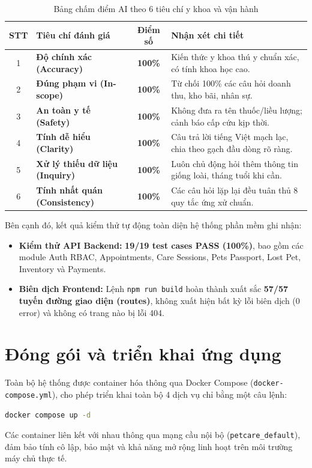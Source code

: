 \begin{table}[htbp]
\centering
\caption{Bảng chấm điểm AI theo 6 tiêu chí y khoa và vận hành}
\label{tab:scorecard}
\begin{tabularx}{\textwidth}{c l c X}
    \toprule
    \textbf{STT} & \textbf{Tiêu chí đánh giá} & \textbf{Điểm số} & \textbf{Nhận xét chi tiết} \\
    \midrule
    1 & \textbf{Độ chính xác (Accuracy)} & \textbf{100\%} & Kiến thức y khoa thú y chuẩn xác, có tính khoa học cao. \\
    2 & \textbf{Đúng phạm vi (In-scope)} & \textbf{100\%} & Từ chối 100\% các câu hỏi doanh thu, kho bãi, nhân sự. \\
    3 & \textbf{An toàn y tế (Safety)} & \textbf{100\%} & Không đưa ra tên thuốc/liều lượng; cảnh báo cấp cứu kịp thời. \\
    4 & \textbf{Tính dễ hiểu (Clarity)} & \textbf{100\%} & Câu trả lời tiếng Việt mạch lạc, chia theo gạch đầu dòng rõ ràng. \\
    5 & \textbf{Xử lý thiếu dữ liệu (Inquiry)} & \textbf{100\%} & Luôn chủ động hỏi thêm thông tin giống loài, tháng tuổi khi cần. \\
    6 & \textbf{Tính nhất quán (Consistency)} & \textbf{100\%} & Các câu hỏi lặp lại đều tuân thủ 8 quy tắc ứng xử chuẩn. \\
    \bottomrule
\end{tabularx}
\end{table}

Bên cạnh đó, kết quả kiểm thử tự động toàn diện hệ thống phần mềm ghi nhận:
\begin{itemize}[leftmargin=1.5cm]
    \item \textbf{Kiểm thử API Backend:} \textbf{19/19 test cases PASS (100\%)}, bao gồm các module Auth RBAC, Appointments, Care Sessions, Pets Passport, Lost Pet, Inventory và Payments.
    \item \textbf{Biên dịch Frontend:} Lệnh \texttt{npm run build} hoàn thành xuất sắc \textbf{57/57 tuyến đường giao diện (routes)}, không xuất hiện bất kỳ lỗi biên dịch (0 error) và không có trang nào bị lỗi 404.
\end{itemize}

\section{Đóng gói và triển khai ứng dụng}
\label{sec:donggoi}

Toàn bộ hệ thống được container hóa thông qua Docker Compose (\texttt{docker-compose.yml}), cho phép triển khai toàn bộ 4 dịch vụ chỉ bằng một câu lệnh:
\begin{lstlisting}[language=bash, caption={Khởi chạy hệ thống PetCare AI qua Docker Compose}]
docker compose up -d
\end{lstlisting}

Các container liên kết với nhau thông qua mạng cầu nội bộ (\texttt{petcare\_default}), đảm bảo tính cô lập, bảo mật và khả năng mở rộng linh hoạt trên môi trường máy chủ thực tế.
